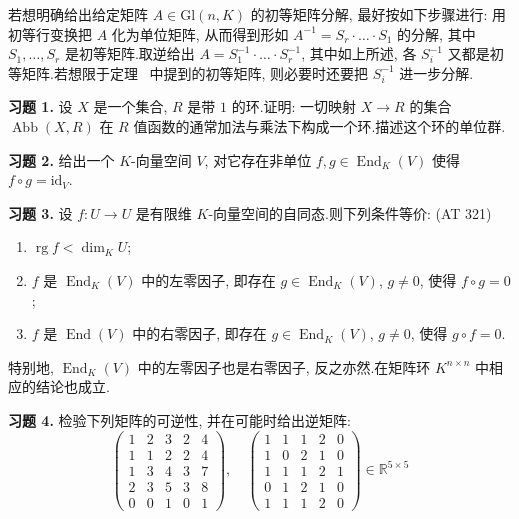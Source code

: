若想明确给出给定矩阵 $A \in \mathrm{Gl}(n, K)$ 的初等矩阵分解, 最好按如下步骤进行: 用初等行变换把 $A$ 化为单位矩阵, 从而得到形如 $A^{-1} = S_r \cdot \ldots \cdot S_1$ 的分解, 其中 $S_1, \ldots, S_r$ 是初等矩阵.取逆给出 $A = S_1^{-1} \cdot \ldots \cdot S_r^{-1}$, 其中如上所述, 各 $S_i^{-1}$ 又都是初等矩阵.若想限于定理~ 中提到的初等矩阵, 则必要时还要把 $S_i^{-1}$ 进一步分解.

\aufgaben

\noindent\textbf{习题 1.} 设 $X$ 是一个集合, $R$ 是带 $1$ 的环.证明: 一切映射 $X \longrightarrow R$ 的集合 $\operatorname{Abb}(X, R)$ 在 $R$ 值函数的通常加法与乘法下构成一个环.描述这个环的单位群.

\noindent\textbf{习题 2.} 给出一个 $K$-向量空间 $V$, 对它存在非单位 $f, g \in \operatorname{End}_K(V)$ 使得 $f \circ g = \mathrm{id}_V$.

\noindent\textbf{习题 3.} 设 $f \colon U \longrightarrow U$ 是有限维 $K$-向量空间的自同态.则下列条件等价: (AT 321)
\begin{enumerate}
\item[(i)] $\operatorname{rg} f < \dim_K U$;
\item[(ii)] $f$ 是 $\operatorname{End}_K(V)$ 中的左零因子, 即存在 $g \in \operatorname{End}_K(V)$, $g \neq 0$, 使得 $f \circ g = 0$;
\item[(iii)] $f$ 是 $\operatorname{End}(V)$ 中的右零因子, 即存在 $g \in \operatorname{End}_K(V)$, $g \neq 0$, 使得 $g \circ f = 0$.
\end{enumerate}
特别地, $\operatorname{End}_K(V)$ 中的左零因子也是右零因子, 反之亦然.在矩阵环 $K^{n \times n}$ 中相应的结论也成立.

\noindent\textbf{习题 4.} 检验下列矩阵的可逆性, 并在可能时给出逆矩阵:
\[
\begin{pmatrix}
1 & 2 & 3 & 2 & 4 \\
1 & 1 & 2 & 2 & 4 \\
1 & 3 & 4 & 3 & 7 \\
2 & 3 & 5 & 3 & 8 \\
0 & 0 & 1 & 0 & 1
\end{pmatrix},
\quad
\begin{pmatrix}
1 & 1 & 1 & 2 & 0 \\
1 & 0 & 2 & 1 & 0 \\
1 & 1 & 1 & 2 & 1 \\
0 & 1 & 2 & 1 & 0 \\
1 & 1 & 1 & 2 & 0
\end{pmatrix} \in \mathbb{R}^{5 \times 5}
\]

